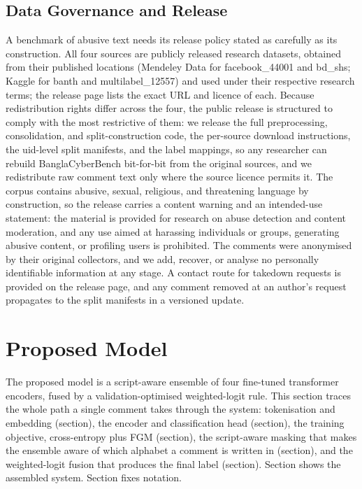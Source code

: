 \documentclass[11pt,a4paper]{article}
\def\dset#1{#1}%
\def\Cref#1{Section}%
\def\cref#1{section}%
\def\texttt#1{#1}%
\def\textsc#1{#1}%
\providecommand{\dset}[1]{\textsc{#1}}
\newcommand{\bench}{BanglaCyberBench}
\begin{document}
\subsection{Data Governance and Release}
\label{sec:governance}

A benchmark of abusive text needs its release policy stated as carefully as its construction. All four sources are publicly released research datasets, obtained from their published locations (Mendeley Data for \dset{facebook\_44001} and \dset{bd\_shs}; Kaggle for \dset{banth} and \dset{multilabel\_12557}) and used under their respective research terms; the release page lists the exact URL and licence of each. Because redistribution rights differ across the four, the public release is structured to comply with the most restrictive of them: we release the full preprocessing, consolidation, and split-construction code, the per-source download instructions, the \texttt{uid}-level split manifests, and the label mappings, so any researcher can rebuild \bench{} bit-for-bit from the original sources, and we redistribute raw comment text only where the source licence permits it. The corpus contains abusive, sexual, religious, and threatening language by construction, so the release carries a content warning and an intended-use statement: the material is provided for research on abuse detection and content moderation, and any use aimed at harassing individuals or groups, generating abusive content, or profiling users is prohibited. The comments were anonymised by their original collectors, and we add, recover, or analyse no personally identifiable information at any stage. A contact route for takedown requests is provided on the release page, and any comment removed at an author's request propagates to the split manifests in a versioned update.

\section{Proposed Model}
\label{sec:methodology}

The proposed model is a script-aware ensemble of four fine-tuned transformer encoders, fused by a validation-optimised weighted-logit rule. This section traces the whole path a single comment takes through the system: tokenisation and embedding (\cref{sec:prelim}), the encoder and classification head (\cref{sec:head}), the training objective, cross-entropy plus FGM (\cref{sec:objective}), the script-aware masking that makes the ensemble aware of which alphabet a comment is written in (\cref{sec:scriptaware}), and the weighted-logit fusion that produces the final label (\cref{sec:fusion}). \Cref{fig:ensemble} shows the assembled system. \Cref{tab:notation} fixes notation.
\end{document}
